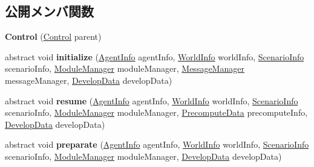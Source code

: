 \subsection*{公開メンバ関数}
\begin{DoxyCompactItemize}
\item 
\hypertarget{classadf_1_1component_1_1control_1_1Control_aeaab5064a2bfb271229b3b62a91c471c}{}\label{classadf_1_1component_1_1control_1_1Control_aeaab5064a2bfb271229b3b62a91c471c} 
{\bfseries Control} (\hyperlink{classadf_1_1component_1_1control_1_1Control}{Control} parent)
\item 
\hypertarget{classadf_1_1component_1_1control_1_1Control_ad3ffe707e43a8bc5bcc531ed3244af4a}{}\label{classadf_1_1component_1_1control_1_1Control_ad3ffe707e43a8bc5bcc531ed3244af4a} 
abstract void {\bfseries initialize} (\hyperlink{classadf_1_1agent_1_1info_1_1AgentInfo}{Agent\+Info} agent\+Info, \hyperlink{classadf_1_1agent_1_1info_1_1WorldInfo}{World\+Info} world\+Info, \hyperlink{classadf_1_1agent_1_1info_1_1ScenarioInfo}{Scenario\+Info} scenario\+Info, \hyperlink{classadf_1_1agent_1_1module_1_1ModuleManager}{Module\+Manager} module\+Manager, \hyperlink{classadf_1_1agent_1_1communication_1_1MessageManager}{Message\+Manager} message\+Manager, \hyperlink{classadf_1_1agent_1_1develop_1_1DevelopData}{Develop\+Data} develop\+Data)
\item 
\hypertarget{classadf_1_1component_1_1control_1_1Control_a73afe92a2ca29fd0f6f95d542fa267df}{}\label{classadf_1_1component_1_1control_1_1Control_a73afe92a2ca29fd0f6f95d542fa267df} 
abstract void {\bfseries resume} (\hyperlink{classadf_1_1agent_1_1info_1_1AgentInfo}{Agent\+Info} agent\+Info, \hyperlink{classadf_1_1agent_1_1info_1_1WorldInfo}{World\+Info} world\+Info, \hyperlink{classadf_1_1agent_1_1info_1_1ScenarioInfo}{Scenario\+Info} scenario\+Info, \hyperlink{classadf_1_1agent_1_1module_1_1ModuleManager}{Module\+Manager} module\+Manager, \hyperlink{classadf_1_1agent_1_1precompute_1_1PrecomputeData}{Precompute\+Data} precompute\+Info, \hyperlink{classadf_1_1agent_1_1develop_1_1DevelopData}{Develop\+Data} develop\+Data)
\item 
\hypertarget{classadf_1_1component_1_1control_1_1Control_a57fc961267ee2cb0728efcbd77ce3577}{}\label{classadf_1_1component_1_1control_1_1Control_a57fc961267ee2cb0728efcbd77ce3577} 
abstract void {\bfseries preparate} (\hyperlink{classadf_1_1agent_1_1info_1_1AgentInfo}{Agent\+Info} agent\+Info, \hyperlink{classadf_1_1agent_1_1info_1_1WorldInfo}{World\+Info} world\+Info, \hyperlink{classadf_1_1agent_1_1info_1_1ScenarioInfo}{Scenario\+Info} scenario\+Info, \hyperlink{classadf_1_1agent_1_1module_1_1ModuleManager}{Module\+Manager} module\+Manager, \hyperlink{classadf_1_1agent_1_1develop_1_1DevelopData}{Develop\+Data} develop\+Data)

\end{DoxyCompactItemize}
